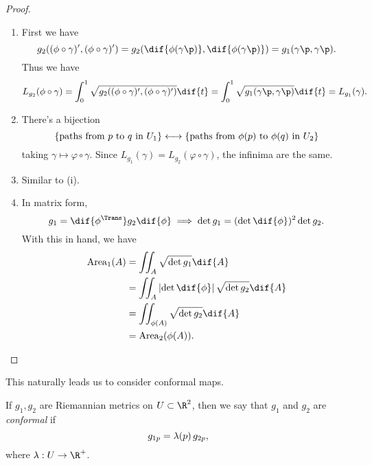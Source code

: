 \begin{proof}
\mbox{}
\begin{enumerate}
	\item First we have
	\begin{equation*}
		g_2((\varphi \circ \gamma)', (\varphi \circ \gamma)')
		= g_2(\dif{\varphi(\gamma\p)}, \dif{\varphi(\gamma\p)})
		= g_1(\gamma\p,\gamma\p).
	\end{equation*}
	Thus we have
	\begin{equation*}
		L_{g_2}(\varphi \circ \gamma)
		= \int_0^1 \sqrt{g_2((\varphi \circ \gamma)', (\varphi\circ\gamma)')} \dif{t}
		= \int_0^1 \sqrt{g_1(\gamma\p, \gamma\p)} \dif{t}
		= L_{g_1}(\gamma).
	\end{equation*}
	\item There's a bijection
	\begin{equation*}
		\left\{\text{paths from $p$ to $q$ in $U_1$}\right\} \longleftrightarrow \left\{\text{paths from $\phi(p)$ to $\phi(q)$ in $U_2$}\right\}
	\end{equation*}
	taking $\gamma \mapsto \varphi\circ\gamma$. Since $L_{g_1}(\gamma) = L_{g_2}(\varphi \circ \gamma)$, the infinima are the same.
	\item Similar to (i).
	\item In matrix form,
	\begin{equation*}
		g_1 = \dif{\varphi^\Trans} g_2 \dif{\varphi} \implies \det g_1 = (\det \dif{\varphi})^2 \det g_2.
	\end{equation*}
	With this in hand, we have
	\begin{align*}
		\Area_1(A)
		&= \iint_A \sqrt{\det g_1} \dif{A} \\
		&= \iint_A \left\vert \det \dif{\varphi} \right\vert \sqrt{\det g_2} \dif{A} \\
		&= \iint_{\varphi(A)} \sqrt{\det g_2} \dif{A} \\
		&= \Area_2(\varphi(A)). \qedhere
	\end{align*}
\end{enumerate}
\end{proof}

This naturally leads us to consider conformal maps.  %

\begin{definition}
	If $g_1,g_2$ are Riemannian metrics on $U\subset \R^2$, then we say that $g_1$ and $g_2$ are \emph{conformal} if
	\begin{equation*}
		g_{1p} = \lambda(p)\,g_{2p},
	\end{equation*}
	where $\lambda:U\to\R^+$.
\end{definition}

